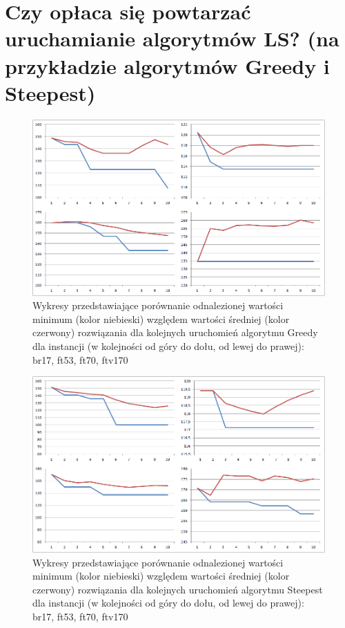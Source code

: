 \section{Czy opłaca się powtarzać uruchamianie algorytmów LS? (na przykładzie algorytmów Greedy i Steepest)}
\begin{figure}[!h]
\centering\includegraphics[width=12cm]{img/min_vs_avg_g.png}
\caption{Wykresy przedstawiające porównanie odnalezionej wartości minimum (kolor niebieski) względem wartości średniej (kolor czerwony) rozwiązania dla kolejnych uruchomień algorytmu Greedy dla instancji (w kolejności od góry do dołu, od lewej do prawej): br17, ft53, ft70, ftv170}\label{rys:mvsag}
\end{figure}
\begin{figure}[!h]
\centering\includegraphics[width=12cm]{img/min_vs_avg_s.png}
\caption{Wykresy przedstawiające porównanie odnalezionej wartości minimum (kolor niebieski) względem wartości średniej (kolor czerwony) rozwiązania dla kolejnych uruchomień algorytmu Steepest dla instancji (w kolejności od góry do dołu, od lewej do prawej): br17, ft53, ft70, ftv170}\label{rys:mvsas}
\end{figure}

